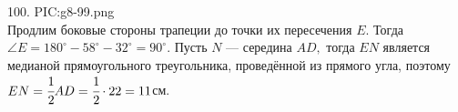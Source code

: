 100. {{PIC:g8-99.png}}\\
Продлим боковые стороны трапеции до точки их пересечения $E.$ Тогда $\angle E=180^\circ-58^\circ-32^\circ=90^\circ.$ Пусть $N$ --- середина $AD,$ тогда $EN$ является медианой прямоугольного треугольника, проведённой из прямого угла, поэтому $EN=\cfrac{1}{2}AD=\cfrac{1}{2}\cdot22=11$см.\newpage\noindent

